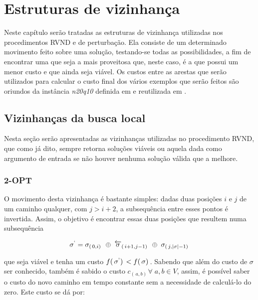 \chapter{Estruturas de vizinhança}\label{chp:LABEL_CHP_5}

\par Neste capítulo serão tratadas as estruturas de vizinhança utilizadas nos procedimentos RVND e de perturbação. Ela consiste de um determinado movimento feito sobre uma solução, testando-se todas as possibilidades, a fim de encontrar uma que seja a mais proveitosa que, neste caso, é a que possui um menor custo e que ainda seja viável. Os custos entre as arestas que serão utilizados para calcular o custo final dos vários exemplos que serão feitos são oriundos da instância \textit{n20q10} definida em \citet{art:REF_ART_3} e reutilizada em \citet{art:REF_ART_5}.

\section{Vizinhanças da busca local}\label{sec:LABEL_CHP_5_SEC_A}

\par Nesta seção serão apresentadas as vizinhanças utilizadas no procedimento RVND, que como já dito, sempre retorna soluções viáveis ou aquela dada como argumento de entrada se não houver nenhuma solução válida que a melhore.

\subsection{2-OPT}\label{sec:LABEL_CHP_5_SUBSEC_A}

\par O movimento desta vizinhança é bastante simples: dadas duas posições $i$ e $j$ de um caminho qualquer, com $j > i + 2$, a subsequência entre esses pontos é invertida. Assim, o objetivo é encontrar essas duas posições que resultem numa subsequência 
    
    \begin{gather}
        \sigma^\lq = \sigma_{(\,0, i)\,}\; \oplus\; \overleftarrow{\sigma}_{(\,i+1, j-1)\,}\; \oplus\; \sigma_{(\,j, |\sigma|-1)\,}
    \end{gather}
    
que seja viável e tenha um custo $f(\,\sigma^\lq)\, < f(\,\sigma)\,$. Sabendo que além do custo de $\sigma$ ser conhecido, também é sabido o custo $c_{(\,a, b)\,} \forall\; a, b \in V$, assim, é possível saber o custo do novo caminho em tempo constante sem a necessidade de calculá-lo do zero. Este custo se dá por:

